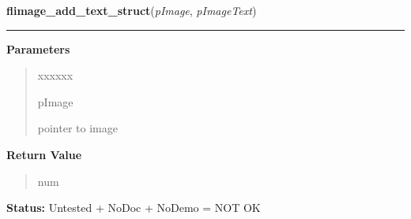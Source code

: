 \hspace{.8\funcindent}\begin{boxedminipage}{\funcwidth}

    \raggedright \textbf{flimage\_add\_text\_struct}(\textit{pImage}, \textit{pImageText})

    \vspace{-1.5ex}

    \rule{\textwidth}{0.5\fboxrule}
\setlength{\parskip}{2ex}
\setlength{\parskip}{1ex}
      \textbf{Parameters}
      \vspace{-1ex}

      \begin{quote}
        \begin{Ventry}{xxxxxx}

          \item[pImage]

          pointer to image

        \end{Ventry}

      \end{quote}

      \textbf{Return Value}
    \vspace{-1ex}

      \begin{quote}
      num

      \end{quote}

\textbf{Status:} Untested + NoDoc + NoDemo = NOT OK



    \end{boxedminipage}

    \label{xformslib:flflimage:flimage_delete_all_text}

    \vspace{0.5ex}

